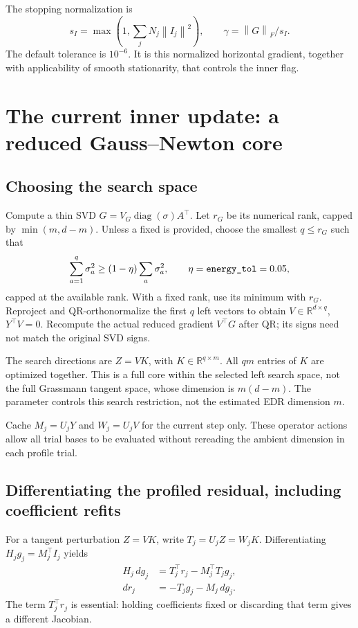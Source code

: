 \documentclass[11pt,a4paper]{article}
\newcommand{\R}{\mathbb R}
\newcommand{\diag}{\operatorname{diag}}
\newcommand{\norm}[1]{\left\lVert#1\right\rVert}
\newcommand{\code}[1]{\texttt{\detokenize{#1}}}
\begin{document}
The stopping normalization is
\begin{equation}\label{eq:certificate}
 s_I=\max\left(1,\sum_jN_j\norm{I_j}^2\right),\qquad
 \gamma=\norm{G}_F/s_I.
\end{equation}
The default tolerance is $10^{-6}$. It is this normalized horizontal
gradient, together with applicability of smooth stationarity, that controls
the inner \code{converged} flag.

\section{The current inner update: a reduced Gauss--Newton core}
\label{sec:gn}
\subsection{Choosing the search space}
Compute a thin SVD $G=V_G\diag(\sigma)A^\top$. Let $r_G$ be its
numerical rank, capped by $\min(m,d-m)$. Unless a fixed \code{rank} is
provided, choose the smallest $q\le r_G$ such that
\begin{equation}\label{eq:energy}
 \sum_{a=1}^q\sigma_a^2\ge(1-\eta)\sum_a\sigma_a^2,
 \qquad\eta=\code{energy_tol}=0.05,
\end{equation}
capped at the available rank. With a fixed rank, use its minimum with
$r_G$. Reproject and QR-orthonormalize the first $q$ left vectors to obtain
$V\in\R^{d\times q}$, $Y^\top V=0$. Recompute the actual reduced gradient
$V^\top G$ after QR; its signs need not match the original SVD signs.

The search directions are $Z=VK$, with $K\in\R^{q\times m}$. All
$qm$ entries of $K$ are optimized together. This is a full core within
the selected left search space, not the full Grassmann tangent space,
whose dimension is $m(d-m)$. The parameter \code{rank} controls this
search restriction, not the estimated EDR dimension $m$.

Cache $M_j=U_jY$ and $W_j=U_jV$ for the current step only. These operator
actions allow all trial bases to be evaluated without rereading the
ambient dimension in each profile trial.

\subsection{Differentiating the profiled residual, including coefficient refits}
For a tangent perturbation $Z=VK$, write $T_j=U_jZ=W_jK$.
Differentiating $H_jg_j=M_j^\top I_j$ yields
\begin{align}
 H_j\,dg_j&=T_j^\top r_j-M_j^\top T_jg_j,\label{eq:dg}\\
 dr_j&=-T_jg_j-M_j\,dg_j.\label{eq:dr}
\end{align}
The term $T_j^\top r_j$ is essential: holding coefficients fixed or
discarding that term gives a different Jacobian.
\end{document}
